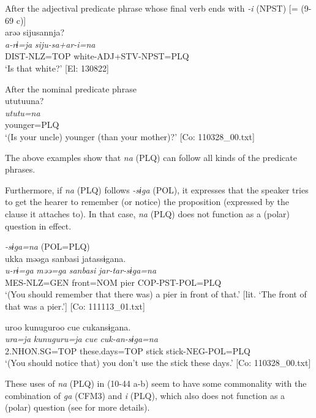\begin{xlist}
  \ex After the adjectival predicate phrase whose final verb ends with \textit{{}-i} (NPST) [= (9-69 c)]\\
      \glll    arəə  sijusannja?\\
    \textit{a-rɨ=ja}  \textit{siju-sa+ar-i=na}\\
    DIST-NLZ=TOP  white-ADJ+STV-NPST=PLQ\\
    \glt     ‘Is that white?’ [El: 130822]

  \ex After the nominal predicate phrase\\
      \glll    ututuuna?\\
    \textit{ututu}\footnotemark\textit{=na}\\
    younger=PLQ\\
  \glt     ‘(Is your uncle) younger (than your mother)?’  [Co: 110328\_00.txt]
  \z
\z{}

The above examples show that \textit{na} (PLQ) can follow all kinds of the predicate phrases.

  Furthermore, if \textit{na} (PLQ) follows \textit{-sɨga} (POL), it expresses that the speaker tries to get the hearer to remember (or notice) the proposition (expressed by the clause it attaches to). In that case, \textit{na} (PLQ) does not function as a (polar) question in effect.

\ea\label{ex:10.44}   \textit{{}-sɨga=na} (POL=PLQ)\\
  \ea  %
      \glll    ukka  məəga  sanbasi  jatassɨgana.\\
      \textit{u-rɨ=ga}  \textit{məə=ga}  \textit{sanbasi}  \textit{jar-tar-sɨga=na}\\
      MES-NLZ=GEN  front=NOM  pier  COP-PST-POL=PLQ\\
      \glt       ‘(You should remember that there was) a pier in front of that.’ [lit. ‘The front of that was a pier.’] [Co: 111113\_01.txt]

  \ex  %
      \glll    uroo  kunuguroo  {\textbar}cue{\textbar}  cukansɨgana.\\
      \textit{ura=ja}  \textit{kunuguru=ja}  \textit{cue}  \textit{cuk-an-sɨga=na}\\
      2.NHON.SG=TOP  these.days=TOP  stick  stick-NEG-POL=PLQ\\
      \glt       ‘(You should notice that) you don’t use the stick these days.’ [Co: 110328\_00.txt]
    \z
\z

These uses of \textit{na} (PLQ) in (10-44 a-b) seem to have some commonality with the combination of \textit{ga} (CFM3) and \textit{i} (PLQ), which also does not function as a (polar) question (see  for more details).


\end{xlist}
